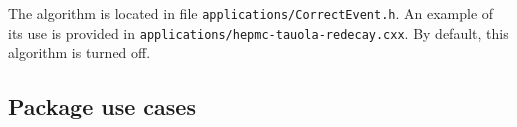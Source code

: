 \documentclass{article}
\begin{document}
The algorithm is located in file {\tt applications/CorrectEvent.h}.
An example of its use is provided in {\tt applications/\-hepmc-\-tau\-ola-redecay.cxx}.
By default, this algorithm is turned off.

\subsection{Package use cases}\label{Sec:tauspinner-uses}
\end{document}
